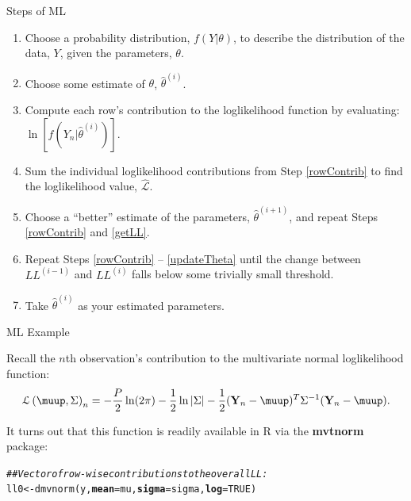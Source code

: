 \documentclass{beamer}\usepackage[]{graphicx}\usepackage[]{color}
\makeatletter
\newcommand{\hlnum}[1]{\textcolor[rgb]{0.69,0.494,0}{#1}}%
\newcommand{\hlcom}[1]{\textcolor[rgb]{0.514,0.506,0.514}{\textit{#1}}}%
\newcommand{\hlstd}[1]{\textcolor[rgb]{0,0,0}{#1}}%
\newcommand{\hlkwb}[1]{\textcolor[rgb]{0,0.341,0.682}{#1}}%
\newcommand{\hlkwc}[1]{\textcolor[rgb]{0,0,0}{\textbf{#1}}}%
\newcommand{\hlkwd}[1]{\textcolor[rgb]{0.004,0.004,0.506}{#1}}%
\newenvironment{kframe}{%
 \def\at@end@of@kframe{}%
 \ifinner\ifhmode%
  \def\at@end@of@kframe{\end{minipage}}%
  \begin{minipage}{\columnwidth}%
 \fi\fi%
 \def\FrameCommand##1{\hskip\@totalleftmargin \hskip-\fboxsep
 \colorbox{shadecolor}{##1}\hskip-\fboxsep
     \hskip-\linewidth \hskip-\@totalleftmargin \hskip\columnwidth}%
 \MakeFramed {\advance\hsize-\width
   \@totalleftmargin\z@ \linewidth\hsize
   \@setminipage}}%
 {\par\unskip\endMakeFramed%
 \at@end@of@kframe}
\newenvironment{knitrout}{}{} %
\newcommand{\mub}[0]{\boldsymbol{\muup}}
\makeatother
\begin{document}

\begin{frame}{Steps of ML}

  \begin{enumerate}
  \item Choose a probability distribution, $f(Y|\theta)$, to describe the 
    distribution of the data, $Y$, given the parameters, $\theta$.
    \vc
  \item Choose some estimate of $\theta$, $\hat{\theta}^{(i)}$.
    \vc
  \item Compute each row's contribution to the loglikelihood function by 
    evaluating: $\ln \left[f\left(Y_n|\hat{\theta}^{(i)}\right)\right]$. 
    \label{rowContrib}
    \vc
  \item Sum the individual loglikelihood contributions from Step 
    \ref{rowContrib} to find the loglikelihood value, $\hat{\mathcal{L}}$. 
    \label{getLL}
    \vc
  \item Choose a ``better'' estimate of the parameters, $\hat{\theta}^{(i + 1)}$, 
    and repeat Steps \ref{rowContrib} and \ref{getLL}. \label{updateTheta}
    \vc
  \item Repeat Steps \ref{rowContrib} -- \ref{updateTheta} until the change 
    between $LL^{(i - 1)}$ and $LL^{(i)}$ falls below some trivially small 
    threshold.
    \vc
  \item Take $\hat{\theta}^{(i)}$ as your estimated parameters.
  \end{enumerate}

\end{frame}

\watermarkoff %

\begin{frame}[fragile]{ML Example}
  
  Recall the $n$th observation's contribution to the multivariate normal 
  loglikelihood function:
  \begin{align*}
   \mathcal{L} \left( \mub, \Sigma \right)_n = 
   -\frac{P}{2} \ln(2\pi) - \frac{1}{2} \ln |\Sigma| - \frac{1}{2} (\mathbf{Y}_n - \mub)^T \Sigma^{-1}(\mathbf{Y}_n - \mub).
  \end{align*}

  \va

  It turns out that this function is readily available in R via the 
  \textbf{mvtnorm} package:

\begin{knitrout}\footnotesize
{}\color{fgcolor}\begin{kframe}
\begin{alltt}
\hlcom{## Vector of row-wise contributions to the overall LL:}
\hlstd{ll0} \hlkwb{<-} \hlkwd{dmvnorm}\hlstd{(y,} \hlkwc{mean} \hlstd{= mu,} \hlkwc{sigma} \hlstd{= sigma,} \hlkwc{log} \hlstd{=} \hlnum{TRUE}\hlstd{)}
\end{alltt}
\end{kframe}
\end{knitrout}

\end{frame}
\end{document}
